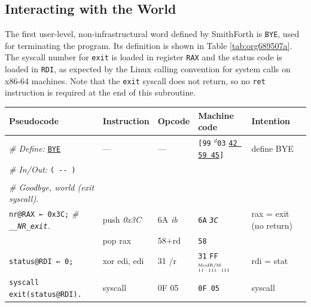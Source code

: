 \documentclass[a4paper,12pt,final]{article}
\begin{document}
\subsection{Interacting with the World}
\label{sec:org4ce6d13}

The first user-level, non-infrastructural word defined by SmithForth
is \texttt{BYE}, used for terminating the program.  Its definition is shown
in Table \ref{tab:org689507a}.  The syscall number for \texttt{exit} is loaded in
register \texttt{RAX} and the status code is loaded in \texttt{RDI}, as expected by
the Linux calling convention for system calls on x86-64 machines.
Note that the \texttt{exit} syscall does not return, so no \texttt{ret} instruction
is required at the end of this subroutine.

\begin{table}[!htbp] \begin{adjustwidth}{-1cm}{-1cm} \fontsize{10}{12.000000}\selectfont
\begin{center}
\begin{tabular}{l|ll|lH}
\textbf{Pseudocode} & \textbf{Instruction} & \textbf{Opcode} & \textbf{Machine code} & \textbf{Intention}\\[0pt]
\hline
\emph{\# Define:} \uline{\texttt{BYE}} & --- & --- & \texttt{[99} \(^{d}\)​\texttt{03} \uline{\texttt{42 59 45}}​\texttt{]} & define BYE\\[0pt]
\emph{\# In/Out:} \texttt{( -​- )} &  &  &  & \\[0pt]
 &  &  &  & \\[0pt]
\emph{\# Goodbye, world (exit syscall).} &  &  &  & \\[0pt]
\texttt{nr@RAX ← 0x3C;}  \emph{\# \texttt{\_\_NR\_exit}.} & push \emph{0x3C} & 6A \emph{ib} & \texttt{6A} \emph{\texttt{3C}} & rax = exit (no return)\\[0pt]
 & pop rax & 58+rd & \texttt{58} & \\[0pt]
\texttt{status@RDI ← 0;} & xor edi, edi & 31 /r & \texttt{31} \texttt{FF}​\(^{\text{\tiny ModR/M}}_{\text{\tiny 11·111·111}}\) & rdi = stat\\[0pt]
\texttt{syscall exit(status@RDI).} & syscall & 0F 05 & \texttt{0F 05} & syscall\\[0pt]
\end{tabular}

\end{center}
\normalsize \end{adjustwidth} \end{table} \vspace{0}
\end{document}
